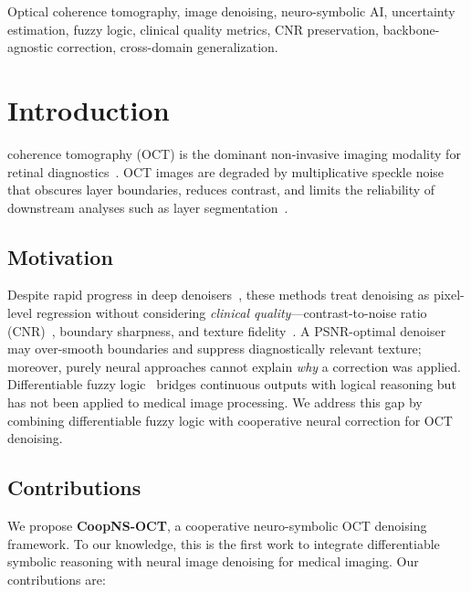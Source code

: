 \documentclass[journal,twoside,web]{ieeecolor}
\begin{document}
\begin{IEEEkeywords}
Optical coherence tomography, image denoising, neuro-symbolic AI, uncertainty estimation, fuzzy logic, clinical quality metrics, CNR preservation, backbone-agnostic correction, cross-domain generalization.
\end{IEEEkeywords}

\section{Introduction}
\label{sec:introduction}
 coherence tomography (OCT) is the dominant non-invasive imaging modality for retinal diagnostics~\cite{huang1991optical}. OCT images are degraded by multiplicative speckle noise~\cite{goodman2007speckle} that obscures layer boundaries, reduces contrast, and limits the reliability of downstream analyses such as layer segmentation~\cite{devalla2018drunet}.

\subsection{Motivation}
Despite rapid progress in deep denoisers~\cite{zhang2017beyond,chen2022simple,liang2021swinir,krull2019noise2void}, these methods treat denoising as pixel-level regression without considering \emph{clinical quality}---contrast-to-noise ratio (CNR)~\cite{rodriguez2020generalized}, boundary sharpness, and texture fidelity~\cite{defauw2018clinical}. A PSNR-optimal denoiser may over-smooth boundaries and suppress diagnostically relevant texture; moreover, purely neural approaches cannot explain \emph{why} a correction was applied. Differentiable fuzzy logic~\cite{vankrieken2022analyzing} bridges continuous outputs with logical reasoning but has not been applied to medical image processing. We address this gap by combining differentiable fuzzy logic with cooperative neural correction for OCT denoising.

\subsection{Contributions}
We propose \textbf{CoopNS-OCT}, a cooperative neuro-symbolic OCT denoising framework. To our knowledge, this is the first work to integrate differentiable symbolic reasoning with neural image denoising for medical imaging. Our contributions are:
\end{document}
